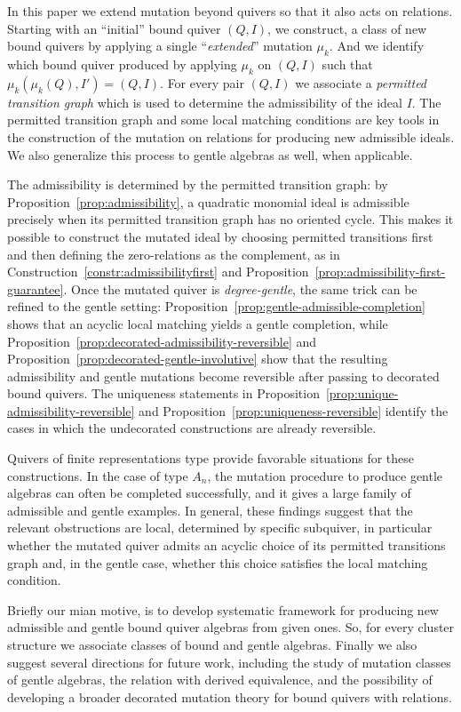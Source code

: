 \documentclass[11pt]{article}
\theoremstyle{plain}
\theoremstyle{definition}
\theoremstyle{remark}
\begin{document}
In this paper we extend mutation beyond quivers so that it also acts on relations.  Starting with an ``initial'' bound quiver \((Q,I)\), we
construct, a class of new bound quivers by applying a single ``\emph{extended}'' mutation $\mu_{k}$. And we identify which bound quiver produced by applying $\mu_{k}$ on \((Q,I)\) such that $\mu_{k}(\mu_k(Q),I')=(Q,I)$.  For every pair  \((Q,I)\) we associate a \emph{permitted transition graph} which is used to determine the admissibility of the ideal $I$. The permitted transition graph and some local matching conditions are key tools in the construction of the  mutation on relations for producing new admissible ideals. We also generalize this process to  gentle algebras as well, when applicable.

The admissibility  is determined by the permitted
transition graph: by Proposition~\ref{prop:admissibility}, a quadratic
monomial ideal is admissible precisely when its permitted transition graph has
no oriented cycle. This makes it possible to construct the mutated ideal by
choosing permitted transitions first and then defining the zero-relations as
the complement, as in Construction~\ref{constr:admissibilityfirst} and
Proposition~\ref{prop:admissibility-first-guarantee}.  Once the mutated quiver
is \emph{degree-gentle}, the same trick can be refined to the gentle setting:
Proposition~\ref{prop:gentle-admissible-completion} shows that an acyclic
local matching yields a gentle completion, while
Proposition~\ref{prop:decorated-admissibility-reversible} and
Proposition~\ref{prop:decorated-gentle-involutive} show that the resulting
admissibility and gentle mutations become reversible after passing to
decorated bound quivers.  The uniqueness statements in
Proposition~\ref{prop:unique-admissibility-reversible} and
Proposition~\ref{prop:uniqueness-reversible} identify the cases in which the
undecorated constructions are already reversible.

Quivers of finite representations type  provide favorable situations for these constructions.  In the case of type \(A_n\), the
mutation procedure to produce gentle algebras can often be completed successfully, and it gives a large
family of admissible and gentle examples.  In general, these findings suggest that the relevant obstructions are  local, determined by specific subquiver, in particular
 whether the mutated quiver admits an acyclic choice of its permitted transitions graph  and, in the gentle case,
whether this choice satisfies the local matching condition.

Briefly our mian motive, is to develop  systematic framework for producing new admissible and gentle bound quiver algebras from
given ones. So, for every cluster structure we associate classes of bound and gentle algebras. Finally we  also suggest several directions for future work, including
the study of mutation classes of gentle algebras, the relation with derived
equivalence, and the possibility of developing a broader decorated mutation
theory for bound quivers with relations.
\end{document}
